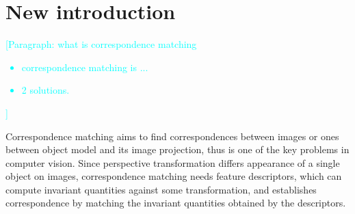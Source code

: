 \documentclass{bmvc2k}
\newcommand{\parmessage}[1]{\textcolor{cyan}{[Paragraph: #1]}}
\begin{document}
\section{New introduction}

\par 
\parmessage{what is correspondence matching
\begin{itemize}
\item correspondence matching is ...
\item 2 solutions.
\end{itemize}
}
Correspondence matching aims to find correspondences between images or ones between object model and its image projection, thus is one of the key problems in computer vision.
Since perspective transformation differs appearance of a single object on images, correspondence matching needs feature descriptors, which can compute invariant quantities against some transformation, and establishes correspondence by matching the invariant quantities obtained by the descriptors.
\end{document}
